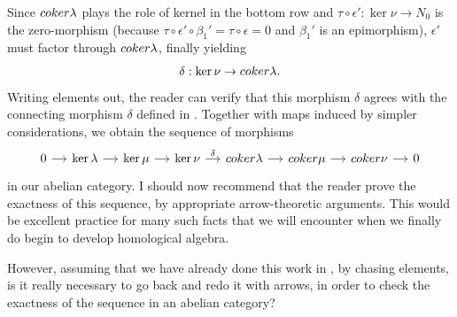 Since $coker\lambda$ plays the role of kernel in the bottom row and
$\tau \circ \epsilon' : \ker\nu \to N_0$ is the zero-morphism (because
$\tau \circ \epsilon' \circ \beta_1' = \tau \circ \epsilon = 0$ and
$\beta_1'$ is an epimorphism), $\epsilon'$ must factor through
$coker\lambda$, finally yielding
\[
  \delta : \ker\nu \to coker\lambda.
\]
Writing elements out, the reader can verify that this morphism
$\delta$ agrees with the connecting morphism $\delta$ defined in
. Together with
maps induced by simpler considerations, we obtain the sequence of
morphisms
\[\begin{tikzcd}[column sep=small]
    0 \arrow[r] & \ker\lambda \arrow[r] & \ker\mu \arrow[r] & \ker\nu
    \arrow[r, "\delta"] & \coker\lambda \arrow[r] & \coker\mu
    \arrow[r] & \coker\nu \arrow[r] & 0
  \end{tikzcd}\] in our abelian category. I should now recommend that
the reader prove the exactness of this sequence, by appropriate
arrow-theoretic arguments. This would be excellent practice for many
such facts that we will encounter when we finally do begin to develop
homological algebra.

However, assuming that we have already done this work in
, by chasing
elements, is it really necessary to go back and redo it with arrows,
in order to check the exactness of the sequence in an abelian
category?

